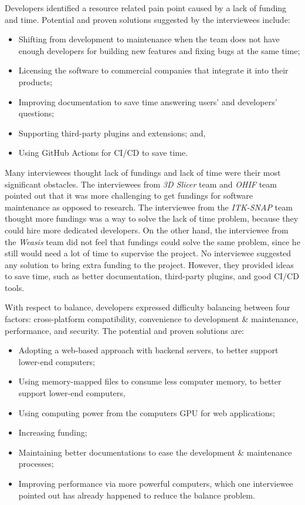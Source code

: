 \documentclass[final, 3p, times, authoryear]{elsarticle}
\begin{document}
Developers identified a resource related pain point caused by a lack of funding
and time.  Potential and proven solutions suggested by the interviewees include:

\begin{itemize}
\item Shifting from development to maintenance when the team does not have
enough developers for building new features and fixing bugs at the same time;
\item Licensing the software to commercial companies that integrate it into
their products;
\item Improving documentation to save time answering users' and developers'
questions;
\item Supporting third-party plugins and extensions; and,
\item Using GitHub Actions for CI/CD to save time.
\end{itemize}

Many interviewees thought lack of fundings and lack of time were their most
significant obstacles. The interviewees from \textit{3D Slicer} team and
\textit{OHIF} team pointed out that it was more challenging to get fundings for
software maintenance as opposed to research. The interviewee from the
\textit{ITK-SNAP} team thought more fundings was a way to solve the lack of time
problem, because they could hire more dedicated developers. On the other hand,
the interviewee from the \textit{Weasis} team did not feel that fundings could
solve the same problem, since he still would need a lot of time to supervise the
project.  No interviewee suggested any solution to bring extra funding to the
project. However, they provided ideas to save time, such as better
documentation, third-party plugins, and good CI/CD tools.

With respect to balance, developers expressed difficulty balancing between four
factors: cross-platform compatibility, convenience to development \&
maintenance, performance, and security.  The potential and proven solutions are:

\begin{itemize}
\item Adopting a web-based approach with backend servers, to better support
lower-end computers;
\item Using memory-mapped files to consume less computer memory, to better
support lower-end computers, 
\item Using computing power from the computers GPU for web applications;
\item Increasing funding;
\item Maintaining better documentations to ease the development \& maintenance
processes;
\item Improving performance via more powerful computers, which one interviewee
pointed out has already happened to reduce the balance problem.
\end{itemize}
\end{document}
